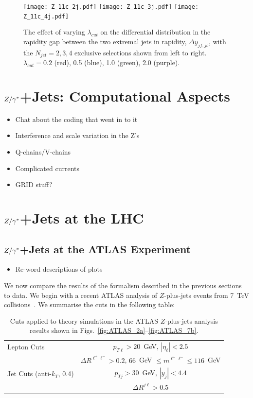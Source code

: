 		\begin{figure}[htp!]
			\centering
			\texttt{[image: Z\_11c\_2j.pdf]}\hfill
			\texttt{[image: Z\_11c\_3j.pdf]}\hfill
			\texttt{[image: Z\_11c\_4j.pdf]}
			\caption{The effect of varying $\lambda_{cut}$ on the differential distribution
			in the rapidity gap between the two extremal jets in rapidity, $\Delta y_{jf, jb}$, with the $N_{jet}=2,3,4$
			exclusive selections shown from left to right.  $\lambda_{cut}=0.2$ (red), 0.5 (blue), 1.0 (green), 2.0 (purple).}
			\label{fig:lambdadistdy}
		\end{figure}

	\section{$Z/\gamma^*$+Jets: Computational Aspects}

		\begin{itemize}
			\item Chat about the coding that went in to it
			\item Interference and scale variation in the Z's
			\item Q-chains/V-chains
			\item Complicated currents
			\item GRID stuff?
		\end{itemize}

	\section{$Z/\gamma^*$+Jets at the LHC}

		\subsection{$Z/\gamma^*$+Jets at the ATLAS Experiment}

			\begin{itemize}
				\item Re-word descriptions of plots
			\end{itemize}

			We now compare the results of the formalism described in the previous sections
			to data.  We begin with a recent ATLAS analysis of $Z$-plus-jets events from
			7~TeV collisions~\cite{Aad:2013ysa}.  We summarise the cuts in the following
			table:

			\begin{table}[bth]
			  \centering
			  \begin{tabular}{|l|c|}
			    \hline
			    Lepton Cuts & $p_{T\ell}>20$~GeV, \; $|\eta_\ell|<2.5$ \\
			    & $\Delta R^{\ell^+\ell^-} > 0.2$, \; $66$~GeV $\leq m^{\ell^+\ell^-} \leq
			      116$~GeV \\ \hline
			    Jet Cuts (anti-$k_T$, 0.4) & $p_{Tj}>30$~GeV, \; $|y_j|<4.4$ \\
			    & $\Delta R^{j\ell} >0.5$ \\
			\hline
			  \end{tabular}
			  \caption{Cuts applied to theory simulations in the ATLAS
			    $Z$-plus-jets analysis results shown in Figs.~\ref{fig:ATLAS_2a}--\ref{fig:ATLAS_7b}.}
			  \label{tab:atlascuts}
			\end{table}

